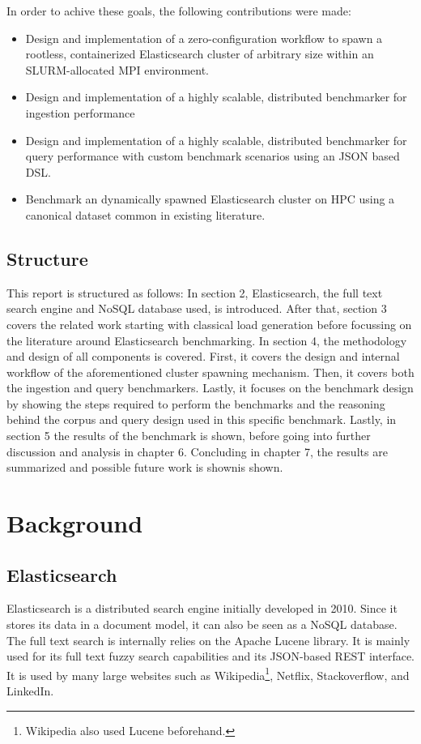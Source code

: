 In order to achive these goals, the following contributions were made:

\begin{itemize}
\item Design and implementation of a zero-configuration workflow to spawn a rootless, containerized Elasticsearch cluster of arbitrary size within an SLURM-allocated \ac{MPI} environment.
\item Design and implementation of a highly scalable, distributed benchmarker for ingestion performance
\item Design and implementation of a highly scalable, distributed benchmarker for query performance with custom benchmark scenarios using an \ac{JSON} based \ac{DSL}.
\item Benchmark an dynamically spawned Elasticsearch cluster on \ac{HPC} using a canonical dataset common in existing literature.
\end{itemize}
\subsection{Structure}
This report is structured as follows: In section 2, Elasticsearch, the full text search engine and NoSQL database used, is introduced. After that, section 3 covers the related work starting with classical load generation before focussing on the literature around Elasticsearch benchmarking. In section 4, the methodology and design of all components is covered. First, it covers the design and internal workflow of the aforementioned cluster spawning mechanism. Then, it covers both the ingestion and query benchmarkers. Lastly, it focuses on the benchmark design by showing the steps required to perform the benchmarks and the reasoning behind the corpus and query design used in this specific benchmark. Lastly, in section 5 the results of the benchmark is shown, before going into further discussion and analysis in chapter 6. Concluding in chapter 7, the results are summarized and possible future work is shownis shown.

\section{Background}
\subsection{Elasticsearch}
Elasticsearch is a distributed search engine initially developed in 2010. Since it stores its data in a document model, it can also be seen as a NoSQL database. The full text search is internally relies on the Apache Lucene library. It is mainly used for its full text fuzzy search capabilities and its \ac{JSON}-based REST interface. It is used by many large websites such as Wikipedia\footnote{Wikipedia also used Lucene beforehand.}, Netflix, Stackoverflow, and LinkedIn.

